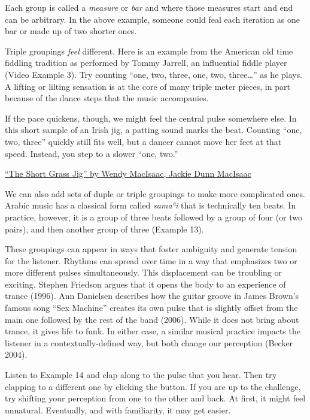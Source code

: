 \documentclass[twoside]{article}
\begin{document}
Each group is called a \emph{measure} or \emph{bar} and where those
measures start and end can be arbitrary. In the above example, someone
could feal each iteration as one bar or made up of two shorter ones.

Triple groupings \emph{feel} different. Here is an example from the
American old time fiddling tradition as performed by Tommy Jarrell, an
influential fiddle player (Video Example 3). Try counting ``one, two, three, one, two,
three\ldots{}'' as he plays. A lifting or lilting sensation is at the
core of many triple meter pieces, in part because of the dance steps
that the music accompanies.

If the pace quickens, though, we might feel the central pulse somewhere
else. In this short sample of an Irish jig, a patting sound marks the
beat. Counting ``one, two, three'' quickly still fits well, but a dancer
cannot move her feet at that speed. Instead, you step to a slower ``one,
two.''

\href{https://folkways.si.edu/wendy-macisaac-fiddle-jackie-dunn-macisaac-piano/the-short-grassjig/the-braes-of-elchies-jig/traditional-jig/gallaghers-jig/the-pibroch-of-odonal-dubh/celtic-old-time-world/music/track/smithsonian}{``The
Short Grass Jig'' by Wendy MacIsaac, Jackie Dunn MacIsaac}

We can also add sets of duple or triple groupings to make more
complicated ones. Arabic music has a classical form called \emph{samaʿi}
that is technically ten beats. In practice, however, it is a group of
three beats followed by a group of four (or two pairs), and then another
group of three (Example 13).

These groupings can appear in ways that foster ambiguity and generate
tension for the listener. Rhythms can spread over time in a way that
emphasizes two or more different pulses simultaneously. This
displacement can be troubling or exciting. Stephen Friedson argues that
it opens the body to an experience of trance (1996). Ann Danielsen
describes how the guitar groove in James Brown's famous song ``Sex
Machine'' creates its own pulse that is slightly offset from the main
one followed by the rest of the band (2006). While it does not bring
about trance, it gives life to funk. In either case, a similar musical
practice impacts the listener in a contextually-defined way, but both
change our perception (Becker 2004).

Listen to Example 14 and clap along to the pulse that you hear. Then
try clapping to a different one by clicking the button. If you are up to
the challenge, try shifting your perception from one to the other and
back. At first, it might feel unnatural. Eventually, and with
familiarity, it may get easier.
\end{document}
